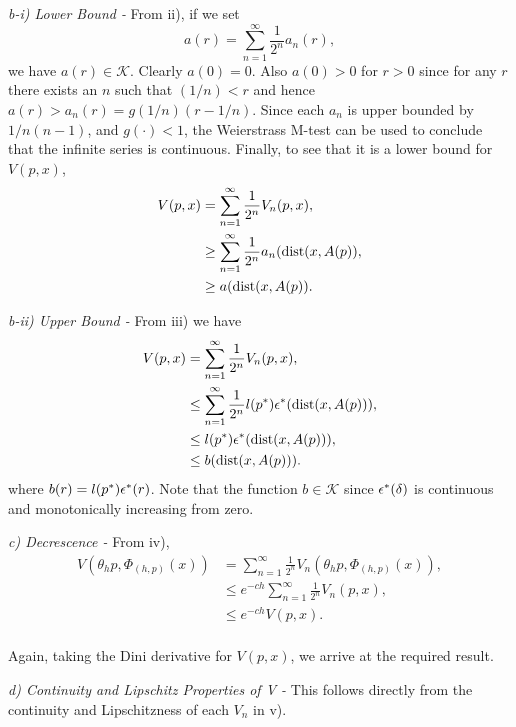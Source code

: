 \begin{prf}
  {\em b-i) Lower Bound - } From ii), if we set
  \[ a(r) = \sum_{n=1}^{\infty} \frac{1}{2^n} a_n(r), \]
  we have $a(r) \in \mathcal{K}$. Clearly $a(0)=0$. Also
  $a(0) > 0$ for $r>0$ since for any $r$ there exists an $n$ such that $(1/n) <
  r$ and hence $a(r) > a_n(r) = g(1/n) (r - 1/n)$. Since each
  $a_n$ is upper bounded by $1/n(n-1)$, and $g(\cdot) < 1$, the
  Weierstrass M-test can be used to conclude that the infinite
  series is continuous. Finally, to see that it is a
  lower bound for $V(p,x)$,
  \begin{align*}
  V(p, x) &= \sum_{n=1}^{\infty} \frac{1}{2^n} V_n(p, x), \\
    &\geq \sum_{n=1}^{\infty} \frac{1}{2^n} a_n({\rm dist}(x, A(p)), \\
    &\geq a({\rm dist}(x,A(p)). \\
  \end{align*}

  {\em b-ii) Upper Bound - } From iii) we have
  \begin{align*}
  V(p, x) &= \sum_{n=1}^{\infty} \frac{1}{2^n} V_n(p, x), \\
    &\leq \sum_{n=1}^{\infty} \frac{1}{2^n} l(p^*) \epsilon^*({\rm dist}(x,
            A(p))), \\
    &\leq l(p^*) \epsilon^*({\rm dist}(x, A(p))), \\
    &\leq b({\rm dist}(x, A(p))). \\
  \end{align*}
  where $b(r) = l(p^*) \epsilon^*(r)$. Note that the function $b \in \mathcal{K}$
since   $\epsilon^*(\delta)$ is continuous and monotonically increasing from zero.

  {\em c) Decrescence - } From iv),
  \begin{align*}
  V( \theta_h p, \Phi_{(h, p)}(x) ) &= \sum_{n=1}^{\infty} \frac{1}{2^n}
       V_n( \theta_h p, \Phi_{(h, p)}(x) ), \\
    &\leq e^{-ch} \sum_{n=1}^{\infty} \frac{1}{2^n} V_n(p,x), \\
    &\leq e^{-ch} V(p, x). \\
  \end{align*}

  Again, taking the Dini derivative for $V(p, x)$, we arrive at the required
  result.

  {\em d) Continuity and Lipschitz Properties of V -} This follows
  directly from the continuity and Lipschitzness of each $V_n$ in v).
\end{prf}

